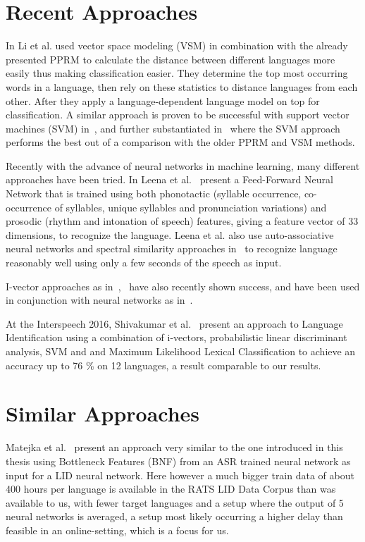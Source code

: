 \section{Recent Approaches}
In \cite{4032773} Li et al. used vector space modeling (VSM) in combination with the already presented PPRM to calculate the distance between different languages more easily thus making classification easier. They determine the top most occurring words in a language, then rely on these statistics to distance languages from each other. After they apply a language-dependent language model on top for classification. A similar approach is proven to be successful with support vector machines (SVM) in~\cite{4590023}, and further substantiated in~\cite{ma2006comparative} where the SVM approach performs the best out of a comparison with the older PPRM and VSM methods.
\par
Recently with the advance of neural networks in machine learning, many different approaches have been tried. In Leena et al.~\cite{1529486} present a Feed-Forward Neural Network that is trained using both phonotactic (syllable occurrence, co-occurrence of syllables, unique syllables and pronunciation variations) and prosodic (rhythm and intonation of speech) features, giving a feature vector of 33 dimensions, to recognize the language. Leena et al. also use auto-associative neural networks and spectral similarity approaches in~\cite{1287674} to recognize language reasonably well using only a few seconds of the speech as input.

\par

I-vector approaches as in~\cite{6680440},~\cite{d2012phonotactic} have also recently shown success, and have been used in conjunction with neural networks as in~\cite{song2015deep}.

At the Interspeech 2016, Shivakumar et al.~\cite{Shivakumar+2016} present an approach to Language Identification using a combination of i-vectors, probabilistic linear discriminant analysis, SVM and  and Maximum Likelihood Lexical Classification to achieve an accuracy up to 76 \% on 12 languages, a result comparable to our results.

\section{Similar Approaches}
Matejka et al.~\cite{matejka2014neural} present an approach very similar to the one introduced in this thesis using Bottleneck Features (BNF) from an ASR trained neural network as input for a LID neural network. Here however a much bigger train data of about 400 hours per language is available in the RATS LID Data Corpus than was available to us, with fewer target languages and a setup where the output of 5 neural networks is averaged, a setup most likely occurring a higher delay than feasible in an online-setting, which is a focus for us.

